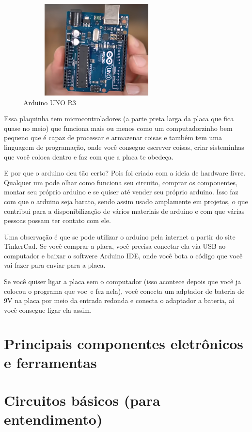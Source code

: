 \documentclass{report}
\begin{document}
	\begin{figure}[ht]
		\centering
		\includegraphics[width=8cm,height=5cm,keepaspectratio=false]{imagens/arduino.png}
		
		\caption{Arduino UNO R3}
		
	\end{figure}
	
	Essa plaquinha tem microcontroladores (a parte preta larga da placa que fica quase no meio) que funciona mais ou menos como um computadorzinho bem pequeno que é capaz de processar e armazenar coisas e também tem uma linguagem de programação, onde você consegue escrever coisas, criar sisteminhas que você coloca dentro e faz com que a placa te obedeça.
	
	E por que o arduino deu tão certo? Pois foi criado com a ideia de hardware livre. Qualquer um pode olhar como funciona seu circuito, comprar os componentes, montar seu próprio arduino e se quiser até vender seu próprio arduino. Isso faz com que o arduino seja barato, sendo assim usado amplamente em projetos, o que contribui para a disponibilização de vários materiais de arduino e com que várias pessoas possam ter contato com ele.
	
	Uma observação é que se pode utilizar o arduíno pela internet a partir do site TinkerCad. Se você comprar a placa, você precisa conectar ela via USB ao computador e baixar o softwere Arduino IDE, onde você bota o código que você vai fazer para enviar para a placa.
	
	Se você quiser ligar a placa sem o computador (isso acontece depois que você ja colocou o programa que voc~e fez nela), você conecta um adptador de bateria de 9V na placa por meio da entrada redonda e conecta o adaptador a bateria, aí você consegue ligar ela assim.
	
	
	
	\section{Principais componentes eletrônicos e ferramentas}
	\section{Circuitos básicos (para entendimento)}
\end{document}
